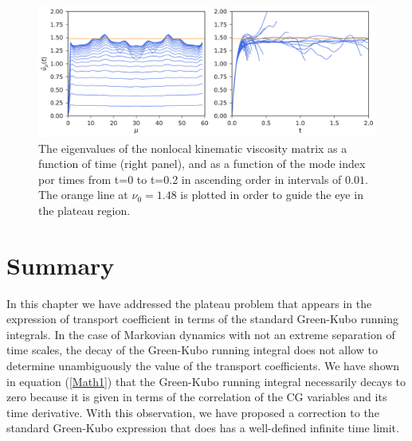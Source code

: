 \documentclass[b5paper,openright,10pt]{book}
\begin{document}
\begin{figure}[h!]
  \centering
\includegraphics[width=\linewidth]{KinVisctFourier-PBC}
\caption[The eigenvalues of the nonlocal kinematic viscosity matrix for an unconfined fluid]{The eigenvalues of the nonlocal kinematic viscosity matrix as a function of time (right panel), and as a function of the mode index por times from t=0 to t=0.2 in ascending order in intervals of $0.01$. The orange line at $\nu_0=1.48$ is plotted in order to guide the eye in the plateau region.}
\label{fig:KinVisctFourier-PBC}
\end{figure}

\newpage
\section{Summary}
\label{Sec:SummaryChapPBC}
In this chapter we have addressed the plateau problem that appears in
the  expression of  transport  coefficient in  terms  of the  standard
Green-Kubo running integrals.  In the  case of Markovian dynamics with
not an extreme separation of time  scales, the decay of the Green-Kubo
running integral does  not allow to determine  unambiguously the value
of the  transport coefficients.  We  have shown in  equation  (\ref{Math1})
that  the  Green-Kubo  running  integral necessarily  decays  to  zero
because it  is given in terms  of the correlation of  the CG variables
and its  time derivative.  With  this observation, we have  proposed a
correction  to  the  standard  Green-Kubo  expression  that  does  has  a
well-defined infinite time limit. 
\end{document}
